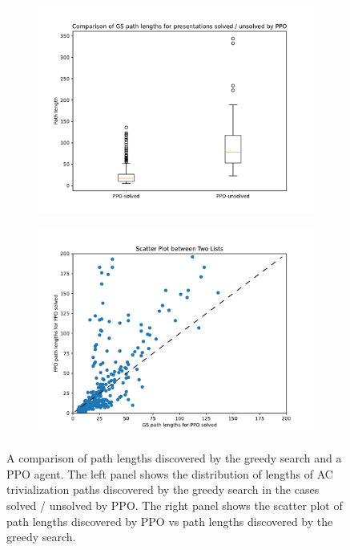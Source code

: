 \begin{figure}
	\centering
	\begin{subfigure}[b]{0.5\textwidth}
		\includegraphics[width=\textwidth]{fig/path_lengths_ppo_solved_vs_unsolved.pdf}
		\caption{}
	\label{fig:path_lengths_ppo_solved_vs_unsolved}
	\end{subfigure}%
	\begin{subfigure}[b]{0.5\textwidth}
		\centering
		\includegraphics[width=1.1\textwidth]{fig/path_lengths_gs_vs_ppo.pdf}
		\caption{}
		\label{fig:path_lengths_gs_vs_ppo}
	\end{subfigure}
	\caption{A comparison of path lengths discovered by the greedy search and a PPO agent. The left panel shows the distribution of lengths of AC trivialization paths discovered by the greedy search in the cases solved / unsolved by PPO. The right panel shows the scatter plot of path lengths discovered by PPO vs path lengths discovered by the greedy search.}
	\label{fig:path_lengths_gs_vs_ppo_full}
\end{figure}

